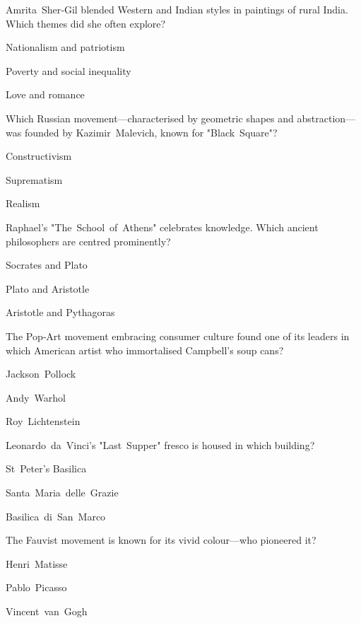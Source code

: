 \begin{enhancedmcq}{Amrita Sher‑Gil blended Western and Indian styles in paintings of rural India. Which themes did she often explore?}
\item Nationalism and patriotism
\item Poverty and social inequality
\item Love and romance

\end{enhancedmcq}
\begin{enhancedmcq}{Which Russian movement—characterised by geometric shapes and abstraction—was founded by Kazimir Malevich, known for "Black Square"?}
\item Constructivism
\item Suprematism
\item Realism

\end{enhancedmcq}
\begin{enhancedmcq}{Raphael's "The School of Athens" celebrates knowledge. Which ancient philosophers are centred prominently?}
\item Socrates and Plato
\item Plato and Aristotle
\item Aristotle and Pythagoras

\end{enhancedmcq}
\begin{enhancedmcq}{The Pop‑Art movement embracing consumer culture found one of its leaders in which American artist who immortalised Campbell's soup cans?}
\item Jackson Pollock
\item Andy Warhol
\item Roy Lichtenstein

\end{enhancedmcq}
\begin{enhancedmcq}{Leonardo da Vinci's "Last Supper" fresco is housed in which building?}
\item St Peter's Basilica
\item Santa Maria delle Grazie
\item Basilica di San Marco

\end{enhancedmcq}
\begin{enhancedmcq}{The Fauvist movement is known for its vivid colour—who pioneered it?}
\item Henri Matisse
\item Pablo Picasso
\item Vincent van Gogh

\end{enhancedmcq}
